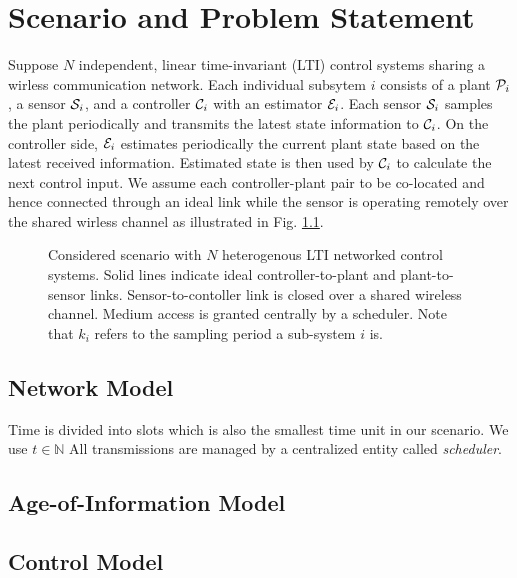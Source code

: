 \chapter{Scenario and Problem Statement}

Suppose $N$ independent, linear time-invariant (LTI) control systems sharing a
wirless communication network. Each individual subsytem $i$ consists of a plant
$\mathcal{P}_i$, a sensor $\mathcal{S}_i$, and a controller $\mathcal{C}_i$ with an estimator
$\mathcal{E}_i$. Each sensor $\mathcal{S}_i$ samples the plant periodically and transmits
the latest state information to $\mathcal{C}_i$. On the controller side,
$\mathcal{E}_i$ estimates periodically the current plant state based on the latest
received information. Estimated state is then used by $\mathcal{C}_i$ to calculate
the next control input. We assume each controller-plant pair to be co-located
and hence connected through an ideal link while the sensor is operating remotely
over the shared wirless channel as illustrated in Fig. \ref{fig:scenario}.

\begin{figure}[h]
  \centering
  
  \caption{Considered scenario with $N$ heterogenous LTI networked control systems. Solid lines indicate ideal controller-to-plant and plant-to-sensor links. Sensor-to-contoller link is closed over a shared wireless channel. Medium access is granted centrally by a scheduler. Note that $k_i$ refers to the sampling period a sub-system $i$ is.}
  \label{fig:scenario}
\end{figure}


\section{Network Model}
Time is divided into slots which is also the smallest time unit in our scenario.
We use $t \in \mathbb{N}$ All transmissions are managed by a centralized entity
called \textit{scheduler}.

\section{Age-of-Information Model}

\section{Control Model}

